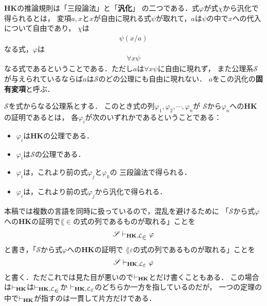 	{\bf HK}の推論規則は「三段論法」と「{\bf 汎化}」
	の二つである．式$\varphi$が式$\chi$から汎化で得られるとは，
	変項$a,x$と$x$が自由に現れる式$\psi$が取れて，$a$は$\psi$の中で$x$への代入について自由であり，
	$\chi$は
	\begin{align}
		\psi(x/a)
	\end{align}
	なる式，$\varphi$は
	\begin{align}
		\forall x \psi	
	\end{align}
	なる式であるということである．ただし$a$は$\forall x \psi$に自由に現れず，
	また公理系$\mathscr{S}$が与えられているならば$a$は$\mathscr{S}$のどの公理にも自由に現れない．
	$a$をこの汎化の{\bf 固有変項}と呼ぶ．
	
	\begin{screen}
		\begin{metadfn}[{\bf HK}における証明]
			$\mathscr{S}$を式からなる公理系とする．
			このとき式の列$\varphi_{1},\varphi_{2},\cdots,\varphi_{n}$が
			$\mathscr{S}$から$\varphi_{n}$への{\bf HK}の証明であるとは，
			各$\varphi_{i}$が次のいずれかであるということである：
			\begin{itemize}
				\item $\varphi_{i}$は{\bf HK}の公理である．
				\item $\varphi_{i}$は$\mathscr{S}$の公理である．
				\item $\varphi_{i}$は，これより前の式$\varphi_{j}$と$\varphi_{k}$の
					三段論法で得られる．
				\item $\varphi_{i}$は，これより前の式$\varphi_{j}$から汎化で得られる．
			\end{itemize}
		\end{metadfn}
	\end{screen}
	
	本稿では複数の言語を同時に扱っているので，混乱を避けるために
	「$\mathscr{S}$から式$\varphi$への{\bf HK}の証明で$\lang{\in}$の式の列であるものが取れる」ことを
	\begin{align}
		\mathscr{S} \provable{\mbox{{\bf HK}},\lang{\in}} \varphi
	\end{align}
	と書き，「$\mathscr{S}$から式$\varphi$への{\bf HK}の証明で
	$\lang{\varepsilon}$の式の列であるものが取れる」ことを
	\begin{align}
		\mathscr{S} \provable{\mbox{{\bf HK}},\lang{\varepsilon}} \varphi
	\end{align}
	と書く．ただこれでは見た目が悪いので$\vdash_{{\scriptsize \mbox{{\bf HK}}}}$とだけ書くこともある．
	この場合は$\vdash_{{\scriptsize \mbox{{\bf HK}}}}$は$\provable{\mbox{{\bf HK}},\lang{\in}}$か
	$\provable{\mbox{{\bf HK}},\lang{\varepsilon}}$のどちらか一方を指しているのだが，
	一つの定理の中で$\vdash_{{\scriptsize \mbox{{\bf HK}}}}$が指すのは一貫して片方だけである．
	
